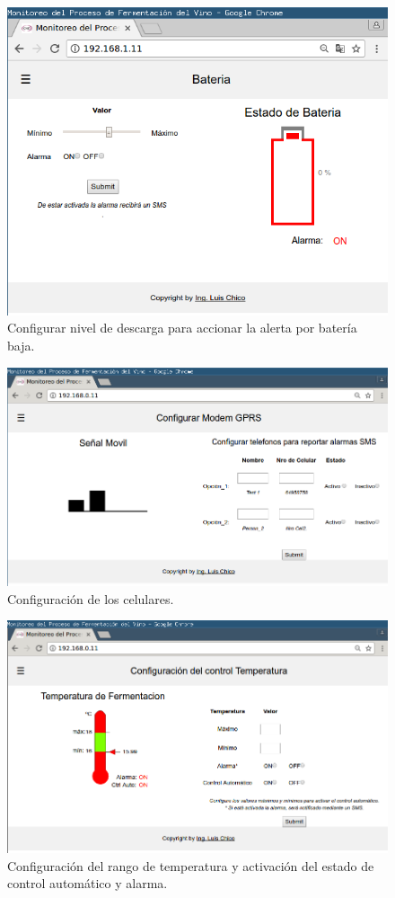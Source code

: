 \begin{figure}[h]
  \centering
  \includegraphics[width=1\linewidth]{./Figures/config_bat.png}
  \caption{Configurar nivel de descarga para accionar la alerta por batería baja.}
  \label{fig:web_bat}
\end{figure}
\begin{figure}[h]
  \centering
  \includegraphics[width=1\linewidth]{./Figures/config_Modem.png}
  \caption{Configuración de los celulares.}
  \label{fig:web_Modem}
\end{figure}
\begin{figure}[h]
  \centering
  \includegraphics[width=1\linewidth]{./Figures/config_temp.png}
  \caption{Configuración del rango de temperatura y activación del estado de control automático y alarma.}
  \label{fig:web_temp}
\end{figure}

